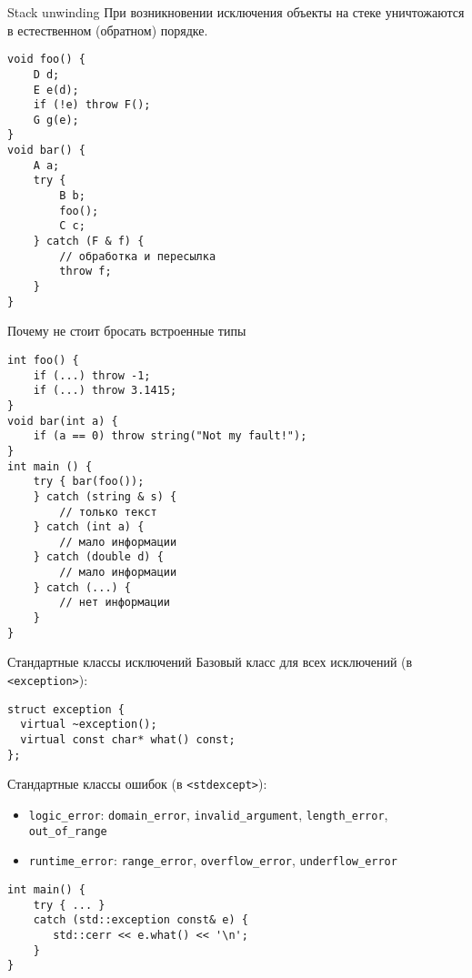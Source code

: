 \documentclass{beamer}
\begin{document}
\begin{frame}[fragile]{Stack unwinding}
При возникновении исключения объекты на стеке
уничтожаются в естественном (обратном) порядке.
\begin{lstlisting}
void foo() {
    D d;
    E e(d);
    if (!e) throw F();
    G g(e);
}
void bar() {
    A a;
    try {
        B b;
        foo();
        C c;
    } catch (F & f) {
        // обработка и пересылка
        throw f;
    }
}
\end{lstlisting}
\end{frame}

\begin{frame}[fragile]{Почему не стоит бросать встроенные типы}
\begin{lstlisting}
int foo() {
    if (...) throw -1;
    if (...) throw 3.1415;
}
void bar(int a) {
    if (a == 0) throw string("Not my fault!");
}
int main () {
    try { bar(foo());
    } catch (string & s) {
        // только текст
    } catch (int a) { 
        // мало информации
    } catch (double d) { 
        // мало информации
    } catch (...) { 
        // нет информации 
    }
}
\end{lstlisting}
\end{frame}

\begin{frame}[fragile]{Стандартные классы исключений}
    Базовый класс для всех исключений (в {\tt <exception>}):
    \begin{lstlisting}
struct exception {
  virtual ~exception();
  virtual const char* what() const;
}; 
    \end{lstlisting}

    Стандартные классы ошибок (в {\tt <stdexcept>}):\\
    \begin{itemize}
        \item {\tt logic\_error}: 
     {\tt domain\_error}, {\tt invalid\_argument}, {\tt length\_error}, {\tt
     out\_of\_range} 
        \item {\tt runtime\_error}: 
        {\tt range\_error},
        {\tt overflow\_error}, 
        {\tt underflow\_error}
    \end{itemize}

\begin{lstlisting}
int main() {
    try { ... }
    catch (std::exception const& e) {
       std::cerr << e.what() << '\n';
    }
}
\end{lstlisting}
\end{frame}
 
\end{document}
